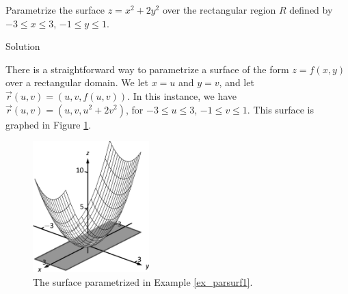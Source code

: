 \begin{example}
\label{ex_parsurf1}Parametrize the surface $z=x^2+2y^2$ over the rectangular region $R$ defined by $-3\leq x\leq 3$, $-1\leq y\leq 1$. 




Solution 


There is a straightforward way to parametrize a surface of the form $z=f(x,y)$ over a rectangular domain. %
We  let $x=u$ and $y=v$, and let $\vec r(u,v) = \left( u,v, f(u,v)\right)$. In this instance, we have $\vec r(u,v) = \left( u,v,u^2+2v^2\right)$, for $-3\leq u\leq 3$, $-1\leq v\leq 1$. This surface is graphed in Figure \ref{fig_Vector_Calc_20}.

\begin{figure}[H]
	\begin{center}
			\includegraphics[width=0.4\textwidth]{fig_Vector_Calc_20}
	\caption{The surface parametrized in Example \ref{ex_parsurf1}.}
	\label{fig_Vector_Calc_20}
	\end{center}
\end{figure}

\end{example}

